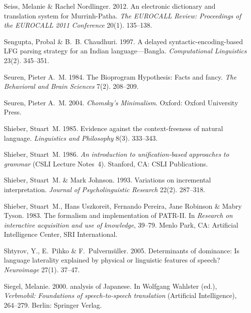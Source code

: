 \begin{thebibliography}{1420}
Seiss, Melanie \& Rachel Nordlinger. 2012.
\newblock An electronic dictionary and translation system for {Murrinh-Patha}.
\newblock \emph{The {EUROCALL Review}: {Proceedings} of the {EUROCALL 2011
  Conference}} 20(1). 135--138.

Sengupta, Probal \& B.~B. Chaudhuri. 1997.
\newblock A delayed syntactic-encoding-based {LFG} parsing strategy for an
  {Indian} language---{Bangla}.
\newblock \emph{Computational Linguistics} 23(2). 345--351.

Seuren, Pieter A.~M. 1984.
\newblock The {Bioprogram Hypothesis}: Facts and fancy.
\newblock \emph{The Behavioral and Brain Sciences} 7(2). 208--209.

Seuren, Pieter A.~M. 2004.
\newblock \emph{{Chomsky's Minimalism}}.
\newblock Oxford: Oxford University Press.

Shieber, Stuart~M. 1985.
\newblock Evidence against the context-freeness of natural language.
\newblock \emph{Linguistics and Philosophy} 8(3). 333--343.

Shieber, Stuart~M. 1986.
\newblock \emph{An introduction to unification-based approaches to grammar}
  (CSLI Lecture Notes~4).
\newblock Stanford, CA: CSLI Publications.

Shieber, Stuart~M. \& Mark Johnson. 1993.
\newblock Variations on incremental interpretation.
\newblock \emph{Journal of Psycholinguistic Research} 22(2). 287--318.

Shieber, Stuart~M., Hans Uszkoreit, Fernando Pereira, Jane Robinson \& Mabry
  Tyson. 1983.
\newblock The formalism and implementation of {PATR-II}.
\newblock In \emph{Research on interactive acquisition and use of knowledge},
  39--79. Menlo Park, CA: Artificial Intelligence Center, SRI International.

Shtyrov, Y., E.~Pihko \& F.~Pulverm{\"u}ller. 2005.
\newblock Determinants of dominance: Is language laterality explained by
  physical or linguistic features of speech?
\newblock \emph{Neuroimage} 27(1). 37--47.

Siegel, Melanie. 2000.
 analysis of {Japanese}.
\newblock In Wolfgang Wahlster (ed.), \emph{Verbmobil: {Foundations} of
  speech-to-speech translation}  (Artificial Intelligence), 264--279. Berlin:
  Springer Verlag.


\end{thebibliography}

